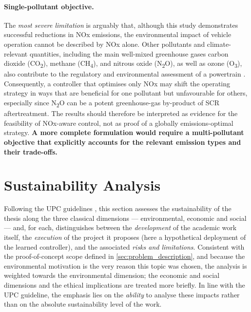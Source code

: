 \paragraph{Single-pollutant objective.} The \emph{most severe limitation} is arguably that, although this study demonstrates successful reductions in \ac{NOx} emissions, the environmental impact of vehicle operation cannot be described by \ac{NOx} alone. Other pollutants and climate-relevant quantities, including the main well-mixed greenhouse gases carbon dioxide (CO\textsubscript{2}), methane (CH\textsubscript{4}), and nitrous oxide (N\textsubscript{2}O), as well as ozone (O\textsubscript{3}), also contribute to the regulatory and environmental assessment of a powertrain \cite{core_writing_team_climate_2023}. Consequently, a controller that optimises only \ac{NOx} may shift the operating strategy in ways that are beneficial for one pollutant but unfavourable for others, especially since N\textsubscript{2}O can be a potent greenhouse-gas by-product of \ac{SCR} aftertreatment. The results should therefore be interpreted as evidence for the feasibility of \ac{NOx}-aware control, not as proof of a globally emissions-optimal strategy. \textbf{A more complete formulation would require a multi-pollutant objective that explicitly accounts for the relevant emission types and their trade-offs.}

\section{Sustainability Analysis}

Following the UPC guidelines \cite{universitat_politecnica_de_catalunya_guia_2023}, this section assesses the sustainability of the thesis along the three classical dimensions --- environmental, economic and social --- and, for each, distinguishes between the \emph{development} of the academic work itself, the \emph{execution} of the project it proposes (here a hypothetical deployment of the learned controller), and the associated \emph{risks and limitations}. Consistent with the proof-of-concept scope defined in \autoref{sec:problem_description}, and because the environmental motivation is the very reason this topic was chosen, the analysis is weighted towards the environmental dimension; the economic and social dimensions and the ethical implications are treated more briefly. In line with the UPC guideline, the emphasis lies on the \emph{ability} to analyse these impacts rather than on the absolute sustainability level of the work.

